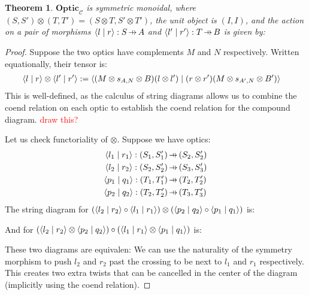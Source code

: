 \documentclass[11pt,a4paper]{article}
\theoremstyle{plain}
\newtheorem{theorem}{Theorem}[subsection]
\theoremstyle{definition}
\newcommand{\C}{\mathscr{C}}
\newcommand{\Optic}{\mathbf{Optic}}
\newcommand{\rep}[2]{{\ensuremath \left\langle #1 \mid #2 \right\rangle}}
\newcommand{\hto}{\ensuremath{\,\mathaccent\shortmid\rightarrow\,}}
\newcommand{\todo}[1]{\textcolor{red}{\small #1}}
\begin{document}
\begin{theorem}
  $\Optic_\C$ is symmetric monoidal, where $(S, S') \otimes (T, T') = (S \otimes T, S' \otimes T')$, the unit object is $(I, I)$, and the action on a pair of morphisms $\rep{l}{r} : S \hto A$ and $\rep{l'}{r'} : T \hto B$ is given by:
  \begin{center}
    
  \end{center}
\end{theorem}
\begin{proof}
  Suppose the two optics have complements $M$ and $N$ respectively. Written equationally, their tensor is:
  \begin{align*}
    \rep{l}{r} \otimes \rep{l'}{r'} &:= \rep{(M \otimes s_{A,N} \otimes B)(l \otimes l')}{(r \otimes r')(M \otimes s_{A',N} \otimes B')}
  \end{align*}
  This is well-defined, as the calculus of string diagrams allows us to combine the coend relation on each optic to establish the coend relation for the compound diagram. \todo{draw this?}

  Let us check functoriality of $\otimes$. Suppose we have optics:
  \begin{align*}
    \rep{l_1}{r_1} : (S_1, S_1') &\hto (S_2, S_2') \\
    \rep{l_2}{r_2} : (S_2, S_2') &\hto (S_3, S_3') \\
    \rep{p_1}{q_1} : (T_1, T_1') &\hto (T_2, T_2') \\
    \rep{p_2}{q_2} : (T_2, T_2') &\hto (T_3, T_3')
  \end{align*}
  The string diagram for $(\rep{l_2}{r_2} \circ \rep{l_1}{r_1}) \otimes (\rep{p_2}{q_2} \circ \rep{p_1}{q_1})$ is:
  \begin{center}
    
  \end{center}
  And for $(\rep{l_2}{r_2} \otimes \rep{p_2}{q_2}) \circ (\rep{l_1}{r_1} \otimes \rep{p_1}{q_1})$ is:
  \begin{center}
    
  \end{center}
  These two diagrams are equivalen: We can use the naturality of the symmetry morphism to push $l_2$ and $r_2$ past the crossing to be next to $l_1$ and $r_1$ respectively. This creates two extra twists that can be cancelled in the center of the diagram (implicitly using the coend relation).


\end{proof}
\end{document}
